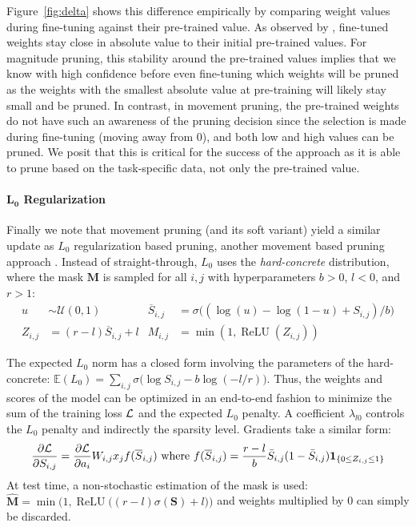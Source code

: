 \documentclass{article}
\newcommand{\relu}{\operatorname{ReLU}}
\begin{document}
Figure~\ref{fig:delta} shows this difference empirically by comparing weight values during fine-tuning against their pre-trained value.  As observed by \citet{Gordon2020CompressingBS}, fine-tuned weights stay close in absolute value to their initial pre-trained values. For magnitude pruning, this stability around the pre-trained values implies that we know with high confidence before even fine-tuning which weights will be pruned as the weights with the smallest absolute value at pre-training will likely stay small and be pruned. In contrast, in movement pruning, the pre-trained weights do not have such an awareness of the pruning decision since the selection is made during fine-tuning (moving away from 0), and both low and high values can be pruned. We posit that this is critical for the success of the approach as it is able to prune based on the task-specific data, not only the pre-trained value.

\paragraph{$\mathbf{L_0}$ Regularization}

Finally we note that movement pruning (and its soft variant) yield a similar update as $L_0$ regularization based pruning, another movement based pruning approach \citep{Louizos2017LearningSN}. Instead of straight-through, $L_0$ uses the \textit{hard-concrete} distribution, where the mask $\mathbf{M}$ is sampled for all $i, j$ with hyperparameters $b>0$, $l<0$, and $r>1$: 
\begin{align*}
     u &\sim \mathcal{U}(0,1) & 
     \overline{{S}}_{i,j} &= \sigma \big( ( \log(u) - \log(1-u) + {S}_{i,j})/b \big)\\
     {Z}_{i,j} &= (r-l) \overline{{S}}_{i,j} + l & 
     {M}_{i,j} &= \min(1, \relu({Z}_{i,j}))
\end{align*}

\noindent The expected $L_0$ norm has a closed form involving the parameters of the hard-concrete: 
$  \mathbb{E}(L_0) = \sum_{i,j} \sigma \big( \log S_{i,j} - b \log(-l/r) \big)$.
Thus, the weights and scores of the model can be optimized in an end-to-end fashion to minimize the sum of the training loss $\cal L$ and the expected $L_0$ penalty. A coefficient $\lambda_{l0}$ controls the $L_0$ penalty and indirectly the sparsity level. Gradients take a similar form:
\begin{equation}
    \label{grad_l0}
    \frac{\partial {\cal L}}{\partial {S}_{i,j}} = \frac{\partial {\cal L}}{\partial a_i} {W}_{i,j} x_j f(\overline{S}_{i,j})
    \text{  where  }
    f(\overline{S}_{i,j}) = \frac{r-l}{b} \bar{S}_{i,j} (1-\bar{S}_{i,j}) \mathbf{1}_{\{0 \leq {Z}_{i,j} \leq 1\}}
\end{equation}
At test time, a non-stochastic estimation of the mask is used: 
    $\mathbf{\hat{M}} = \min\Big( 1, \relu \big( (r-l) \sigma(\mathbf{S}) +l \big) \Big)$
and weights multiplied by 0 can simply be discarded.
\end{document}
